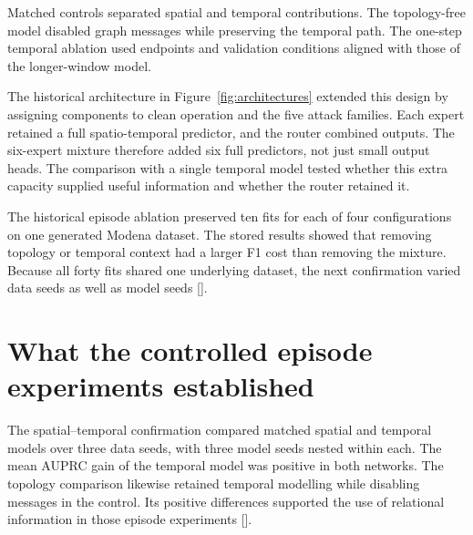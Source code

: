 Matched controls separated spatial and temporal contributions. The topology-free model disabled graph messages while preserving the temporal path. The one-step temporal ablation used endpoints and validation conditions aligned with those of the longer-window model.

The historical architecture in Figure~\ref{fig:architectures} extended this design by assigning components to clean operation and the five attack families. Each expert retained a full spatio-temporal predictor, and the router combined outputs. The six-expert mixture therefore added six full predictors, not just small output heads. The comparison with a single temporal model tested whether this extra capacity supplied useful information and whether the router retained it.


The historical episode ablation preserved ten fits for each of four configurations on one generated Modena dataset. The stored results showed that removing topology or temporal context had a larger F1 cost than removing the mixture. Because all forty fits shared one underlying dataset, the next confirmation varied data seeds as well as model seeds [].

\section{What the controlled episode experiments established}
The spatial--temporal confirmation compared matched spatial and temporal models over three data seeds, with three model seeds nested within each. The mean AUPRC gain of the temporal model was positive in both networks. The topology comparison likewise retained temporal modelling while disabling messages in the control. Its positive differences supported the use of relational information in those episode experiments [].

